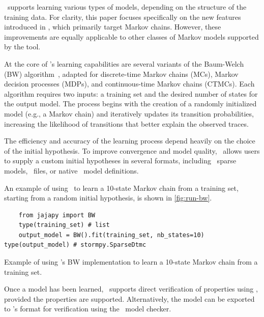 \Jajapy\ supports learning various types of models, depending on the structure of the training data.
For clarity, this paper focuses specifically on the new features introduced in \JajapyTwo, which primarily target Markov chains.
However, these improvements are equally applicable to other classes of Markov models supported by the tool.

At the core of \Jajapy's learning capabilities are several variants of the Baum-Welch (BW) algorithm~\cite{Baum70,Rabiner89}, adapted for discrete-time Markov chains (MCs), Markov decision processes (MDPs)\cite{BacciILR21}, and continuous-time Markov chains (CTMCs)\cite{BacciILR23}.
Each algorithm requires two inputs: a training set and the desired number of states for the output model.
The process begins with the creation of a randomly initialized model (e.g., a Markov chain) and iteratively updates its transition probabilities, increasing the likelihood of transitions that better explain the observed traces.

The efficiency and accuracy of the learning process depend heavily on the choice of the initial hypothesis.
To improve convergence and model quality, \Jajapy\ allows users to supply a custom initial hypotheses in several formats, including \Stormpy~sparse models, \Prism~files, or native \Jajapy\ model definitions.

An example of using \Jajapy\ to learn a 10-state Markov chain from a training set, starting from a random initial hypothesis, is shown in \autoref{fig:run-bw}.

\begin{listing}
    \begin{verbatim} 
    from jajapy import BW 
    type(training_set) # list 
    output_model = BW().fit(training_set, nb_states=10) type(output_model) # stormpy.SparseDtmc 
    \end{verbatim}
    \caption{Example of using \Jajapy's BW implementation to learn a 10-state Markov chain from a training set.}
    \label{fig:run-bw}
\end{listing}


Once a model has been learned, \Jajapy\ supports direct verification of properties using \Storm, provided the properties are supported.
Alternatively, the model can be exported to \Prism's format for verification using the \Prism\ model checker.


